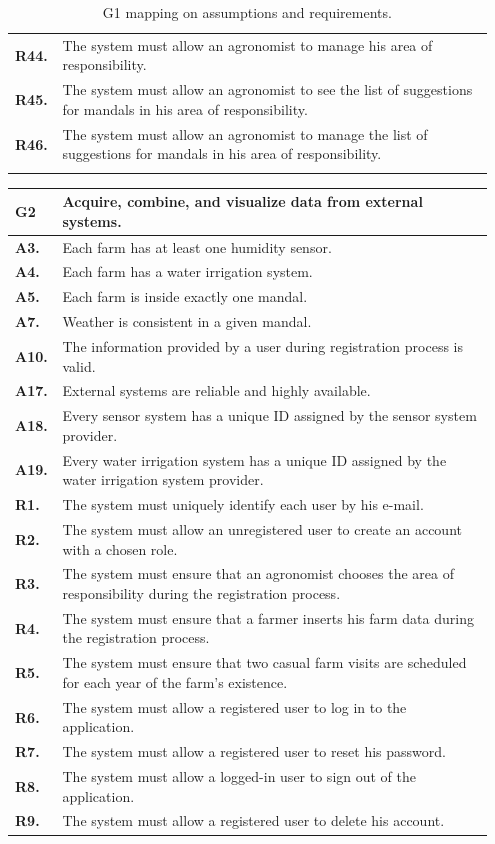 \begin{longtable}{p{0.07\linewidth} p{0.88\linewidth}}
	\textbf{R44.} & The system must allow an agronomist to manage his area of responsibility.\\
	\textbf{R45.} & The system must allow an agronomist to see the list of suggestions for mandals in his area of responsibility.\\
	\textbf{R46.} & The system must allow an agronomist to manage the list of suggestions for mandals in his area of responsibility.\\
	
    \bottomrule
    \caption{G1 mapping on assumptions and requirements.}
\end{longtable}

\begin{longtable}{p{0.07\linewidth} p{0.88\linewidth}} 
    \toprule
    \textbf{G2} & Acquire, combine, and visualize data from external systems. \\ 
    \midrule
    \textbf{A3.} & Each farm has at least one humidity sensor.\\ 
    \textbf{A4.} & Each farm has a water irrigation system.\\ 
    \textbf{A5.} & Each farm is inside exactly one mandal.\\ 
    \textbf{A7.} & Weather is consistent in a given mandal.\\ 
    \textbf{A10.} & The information provided by a user during registration process is valid.\\ 
    \textbf{A17.} & External systems are reliable and highly available.\\
    \textbf{A18.} & Every sensor system has a unique ID assigned by the sensor system provider. \\
    \textbf{A19.} & Every water irrigation system has a unique ID assigned by the water irrigation system provider. \\
    
    \midrule
	\textbf{R1.} & The system must uniquely identify each user by his e-mail. \\
	\textbf{R2.} & The system must allow an unregistered user to create an account with a chosen role. \\
	\textbf{R3.} & The system must ensure that an agronomist chooses the area of responsibility during the registration process. \\
	\textbf{R4.} & The system must ensure that a farmer inserts his farm data during the registration process.\\
	\textbf{R5.} & The system must ensure that two casual farm visits are scheduled for each year of the farm's existence.\\
	\textbf{R6.} & The system must allow a registered user to log in to the application. \\
	\textbf{R7.} & The system must allow a registered user to reset his password. \\
	\textbf{R8.} & The system must allow a logged-in user to sign out of the application. \\
	\textbf{R9.} & The system must allow a registered user to delete his account. \\
	

\end{longtable}
